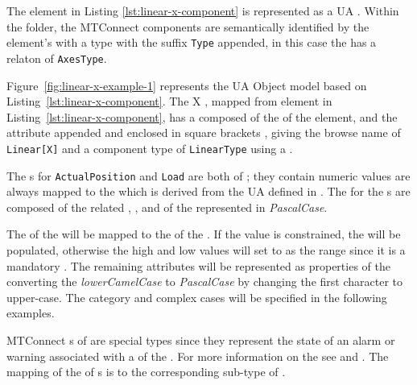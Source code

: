 The  element in Listing \ref{lst:linear-x-component} is represented as a UA . Within the folder, the MTConnect components are semantically identified by the element's  with a type with the suffix \texttt{Type} appended, in this case the    has a  relaton of \texttt{AxesType}. 



Figure~\ref{fig:linear-x-example-1} represents the UA Object model based on  Listing~\ref{lst:linear-x-component}. The  X , mapped from  element in Listing~\ref{lst:linear-x-component}, has a  composed of the  of the element, and the  attribute appended and enclosed in square brackets \element{[X]}, giving the browse name of \texttt{Linear[X]} and a component type of \texttt{LinearType} using a  .

The s for \texttt{ActualPosition} and \texttt{Load} are both of  ; they contain numeric values are always mapped to the  which is derived from the UA  defined in \cite{UAPart8}. The  for the s are composed of the related  , , and  of the  represented in \textit{PascalCase}.

The  of the  will be mapped to the   of the . If the value is constrained, the  will be populated, otherwise the high and low values will set to  as the range since it is a mandatory . The remaining attributes will be represented as properties of the  converting the \textit{lowerCamelCase} to \textit{PascalCase} by changing the first character to upper-case. The  category and complex cases will be specified in the following examples.

MTConnect s of   are special types since they represent the state of an alarm or warning associated with a  of the . For more information on the  see \cite{MTCPart2} and \cite{MTCPart3}. The mapping of the   of s is to the corresponding  sub-type of .

